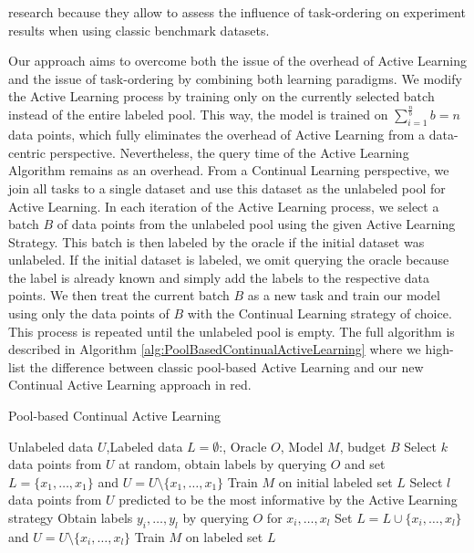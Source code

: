 research because they allow to assess the influence of task-ordering on experiment results when using classic benchmark datasets. \par
Our approach aims to overcome both the issue of the overhead of Active Learning and the issue of task-ordering by combining both learning paradigms. We modify the Active
Learning process by training only on the currently selected batch instead of the entire labeled pool. This way, the model is trained on $\sum_{i=1}^{\frac{n}{b}} b = n$ 
data points, which fully eliminates the overhead of Active Learning from a data-centric perspective. Nevertheless, the query time of the Active Learning Algorithm remains
as an overhead. From a Continual Learning perspective, we join all tasks to a single dataset and use this dataset as the unlabeled pool for Active Learning. In each iteration
of the Active Learning process, we select a batch $B$ of data points from the unlabeled pool using the given Active Learning Strategy. This batch is then labeled by the
oracle if the initial dataset was unlabeled. If the initial dataset is labeled, we omit querying the oracle because the label is already known and simply add the labels
to the respective data points. We then treat the current batch $B$ as a new task and train our model using only the data points of $B$ with the Continual Learning strategy of
choice. This process is repeated until the unlabeled pool is empty. The full algorithm is described in Algorithm \ref{alg:PoolBasedContinualActiveLearning} where we high-
list the difference between classic pool-based Active Learning and our new Continual Active Learning approach in red. \par

\begin{algorithm}
    \caption{Pool-based Continual Active Learning} \label{alg:PoolBasedContinualActiveLearning}
    \begin{algorithmic}[1]
        \Require Unlabeled data $U$,Labeled data $L = \emptyset$:, Oracle $O$, Model $M$, budget $B$
        \State Select $k$ data points from $U$ at random, obtain labels by querying $O$ and set $L=\{x_1,\ldots,x_1\}$
        and $U = U \setminus \{x_1,\ldots,x_1\}$ 
        \State Train $M$ on initial labeled set $L$
            \State Select $l$ data points from $U$ predicted to be the most informative by the Active Learning strategy
            \State Obtain labels $y_i,\ldots,y_l$ by querying $O$ for $x_i,\ldots,x_l$
            \State Set $L= L \cup \{x_i,\ldots,x_l\}$ and $U = U \setminus \{x_i,\ldots,x_l\}$
            \State Train $M$ on labeled set $L$
        \EndWhile
    \end{algorithmic}
\end{algorithm}


